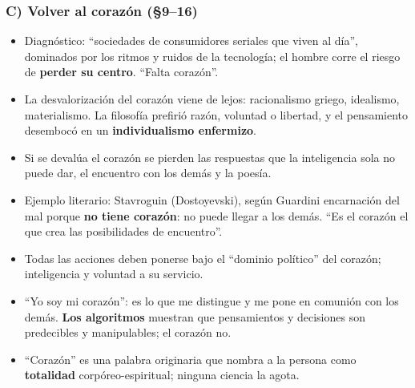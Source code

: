 \documentclass[10pt,a4paper]{article}
\begin{document}
\subsubsection{C) Volver al corazón (\S{}9--16)}
\begin{itemize}
\item Diagnóstico: ``sociedades de consumidores seriales que viven al día'', dominados por los ritmos y ruidos de la tecnología; el hombre corre el riesgo de \textbf{perder su centro}. ``Falta corazón''.
\item La desvalorización del corazón viene de lejos: racionalismo griego, idealismo, materialismo. La filosofía prefirió razón, voluntad o libertad, y el pensamiento desembocó en un \textbf{individualismo enfermizo}.
\item Si se devalúa el corazón se pierden las respuestas que la inteligencia sola no puede dar, el encuentro con los demás y la poesía.
\item Ejemplo literario: Stavroguin (Dostoyevski), según Guardini encarnación del mal porque \textbf{no tiene corazón}: no puede llegar a los demás. ``Es el corazón el que crea las posibilidades de encuentro''.
\item Todas las acciones deben ponerse bajo el ``dominio político'' del corazón; inteligencia y voluntad a su servicio.
\item ``Yo soy mi corazón'': es lo que me distingue y me pone en comunión con los demás. \textbf{Los algoritmos} muestran que pensamientos y decisiones son predecibles y manipulables; el corazón no.
\item ``Corazón'' es una palabra originaria que nombra a la persona como \textbf{totalidad} corpóreo-espiritual; ninguna ciencia la agota.
\end{itemize}
\end{document}
